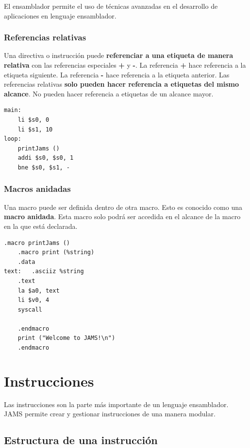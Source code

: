 El ensamblador permite el uso de técnicas avanzadas en
el desarrollo de aplicaciones en lenguaje ensamblador.

\subsubsection{Referencias relativas}\label{subsubsec:referencias-relativas}

Una directiva o instrucción puede \textbf{referenciar a una etiqueta de manera
relativa} con las referencias especiales \textbf{+} y \textbf{-}.
La referencia \textbf{+} hace referencia a la etiqueta siguiente.
La referencia \textbf{-} hace referencia a la etiqueta anterior.
Las referencias relativas \textbf{solo pueden hacer referencia
a etiquetas del mismo alcance}.
No pueden hacer referencia a etiquetas de un alcance mayor.

\begin{lstlisting}[frame=single,label={lst:relative-reference}]
main:
    li $s0, 0
    li $s1, 10
loop:
    printJams ()
    addi $s0, $s0, 1
    bne $s0, $s1, -
\end{lstlisting}

\subsubsection{Macros anidadas}\label{subsubsec:macros-anidadas}

Una macro puede ser definida dentro de otra macro.
Esto es conocido como una \textbf{macro anidada}.
Esta macro solo podrá ser accedida en el alcance de la macro
en la que está declarada.

\begin{lstlisting}[frame=single,label={lst:nested-macro}]
    .macro printJams ()
    .macro print (%string)
    .data
text:   .asciiz %string
    .text
    la $a0, text
    li $v0, 4
    syscall

    .endmacro
    print ("Welcome to JAMS!\n")
    .endmacro
\end{lstlisting}


\section{Instrucciones}\label{sec:instrucciones}

Las instrucciones son la parte más importante de un lenguaje ensamblador.
JAMS permite crear y gestionar instrucciones de una manera modular.

\subsection{Estructura de una instrucción}\label{subsec:estructura-de-una-instruccion}

